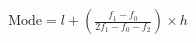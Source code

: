 \documentclass[preview]{standalone}
\begin{document}
\begin{align*}
\text{Mode} = l + \left(\frac{f_1 - f_0}{2f_1 - f_0 - f_2}\right) \times h
\end{align*}
\end{document}
